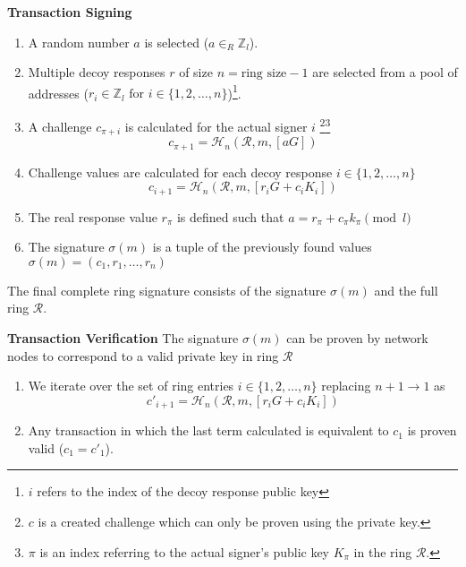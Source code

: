 \noindent\textbf{Transaction Signing}
\begin{enumerate}
    \item A random number $a$ is selected ($a \in _R\mathbb{Z}_l$).
    \item Multiple decoy responses $r$ of size $n=\text{ring size}-1$ are selected from a pool of addresses ($r_i \in \mathbb{Z}_l \text{ for } i \in \{1,2,\dots,n\}$)\footnote{$i$ refers to the index of the decoy response public key}.
    \item A challenge $c_{\pi+i}$ is calculated for the actual signer $i$ \footnote{$c$ is a created challenge which can only be proven using the private key.}\footnote{$\pi$ is an index referring to the actual signer's public key $K_\pi$ in the ring $\mathcal{R}$.}
        \[c_{\pi+1}=\mathcal{H}_n(\mathcal{R},m,[aG])\]
    \item Challenge values are calculated for each decoy response $i\in\{1,2,\dots,n\}$
        \[c_{i+1}=\mathcal{H}_n(\mathcal{R},m,[r_iG+c_iK_i])\]
    \item The real response value $r_\pi$ is defined such that $a=r_\pi+c_{\pi}k_{\pi}\pmod{l}$
    \item The signature $\sigma(m)$ is a tuple of the previously found values $\sigma(m)=(c_1,r_1,\dots,r_n)$
\end{enumerate}
The final complete ring signature consists of the signature $\sigma(m)$ and the full ring $\mathcal{R}$. \cite{zero2monero}


\noindent\textbf{Transaction Verification}
The signature $\sigma(m)$ can be proven by network nodes to correspond to a valid private key in ring $\mathcal{R}$
\begin{enumerate}
    \item We iterate over the set of ring entries $i\in\{1,2,\dots,n\}$ replacing $n+1 \rightarrow 1$ as \[c'_{i+1}=\mathcal{H}_n(\mathcal{R},m,[r_iG+c_iK_i])\]
    \item Any transaction in which the last term calculated is equivalent to $c_1$ is proven valid ($c_1=c'_1$). \cite{zero2monero}
\end{enumerate}

